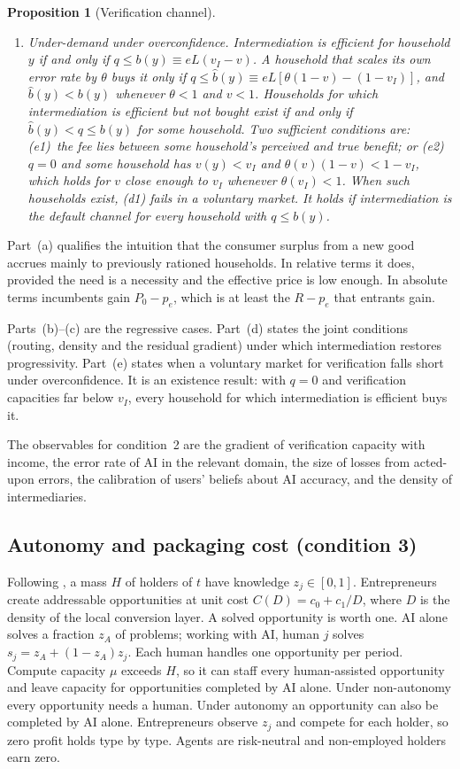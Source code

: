 \documentclass[12pt]{article}
\newtheorem{proposition}{Proposition}
\theoremstyle{remark}
\begin{document}
\begin{proposition}[Verification channel]
\begin{enumerate}[label=(\alph*),itemsep=1pt]
\item \emph{Under-demand under overconfidence.} Intermediation is efficient for household $y$ if and only if $q\le b(y)\equiv eL(v_I-v)$. A household that scales its own error rate by $\theta$ buys it only if $q\le\hat b(y)\equiv eL[\theta(1-v)-(1-v_I)]$, and $\hat b(y)<b(y)$ whenever $\theta<1$ and $v<1$. Households for which intermediation is efficient but not bought exist if and only if $\hat b(y)<q\le b(y)$ for some household. Two sufficient conditions are: (e1)~the fee lies between some household's perceived and true benefit; or (e2)~$q=0$ and some household has $v(y)<v_I$ and $\theta(v)(1-v)<1-v_I$, which holds for $v$ close enough to $v_I$ whenever $\theta(v_I)<1$. When such households exist, (d1) fails in a voluntary market. It holds if intermediation is the default channel for every household with $q\le b(y)$.
\end{enumerate}
\end{proposition}

Part~(a) qualifies the intuition that the consumer surplus from a new good accrues mainly to previously rationed households. In relative terms it does, provided the need is a necessity and the effective price is low enough. In absolute terms incumbents gain $P_0-p_e$, which is at least the $R-p_e$ that entrants gain.

Parts~(b)--(c) are the regressive cases. Part~(d) states the joint conditions (routing, density and the residual gradient) under which intermediation restores progressivity. Part~(e) states when a voluntary market for verification falls short under overconfidence. It is an existence result: with $q=0$ and verification capacities far below $v_I$, every household for which intermediation is efficient buys it.

The observables for condition~2 are the gradient of verification capacity with income, the error rate of AI in the relevant domain, the size of losses from acted-upon errors, the calibration of users' beliefs about AI accuracy, and the density of intermediaries.

\subsection{Autonomy and packaging cost (condition 3)}\label{sec:autonomy}

Following \citet{garicano2026comment}, a mass $H$ of holders of $t$ have knowledge $z_j\in[0,1]$. Entrepreneurs create addressable opportunities at unit cost $C(D)=c_0+c_1/D$, where $D$ is the density of the local conversion layer. A solved opportunity is worth one. AI alone solves a fraction $z_A$ of problems; working with AI, human $j$ solves $s_j=z_A+(1-z_A)z_j$. Each human handles one opportunity per period. Compute capacity $\mu$ exceeds $H$, so it can staff every human-assisted opportunity and leave capacity for opportunities completed by AI alone. Under non-autonomy every opportunity needs a human. Under autonomy an opportunity can also be completed by AI alone. Entrepreneurs observe $z_j$ and compete for each holder, so zero profit holds type by type. Agents are risk-neutral and non-employed holders earn zero.
\end{document}
